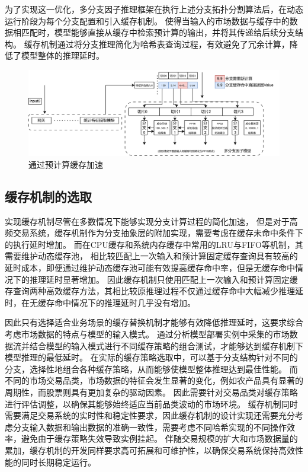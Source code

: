 为了实现这一优化，多分支因子推理框架在执行上述分支拓扑分割算法后，在动态运行阶段为每个分支配置和引入缓存机制。
使得当输入的市场数据与缓存中的数据相匹配时，模型能够直接从缓存中检索预计算的输出，并将其传递给后续分支结构。
缓存机制通过将分支推理简化为哈希表查询过程，有效避免了冗余计算，降低了模型整体的推理延时。
\begin{figure}[h]
    \centering
    \includegraphics[width=1\textwidth]{image/chap03/precom.png}
    \caption{通过预计算缓存加速}
    \label{fig:hole2}
\end{figure}

\subsection{缓存机制的选取}

实现缓存机制尽管在多数情况下能够实现分支计算过程的简化加速，
但是对于高频交易系统，缓存机制作为分支抽象层的附加实现，需要考虑在缓存未命中条件下的执行延时增加。
而在CPU缓存和系统内存缓存中常用的LRU与FIFO等机制，其需要维护动态缓存池，
相比较匹配上一次输入和预计算固定缓存查询具有较高的延时成本，即便通过维护动态缓存池可能有效提高缓存命中率，但是无缓存命中情况下的推理延时显著增加。
因此缓存机制只使用匹配上一次输入和预计算固定缓存查询两种高效缓存方法，其相比较原推理过程不仅通过缓存命中大幅减少推理延时，在无缓存命中情况下的推理延时几乎没有增加。

因此只有选择适合业务场景的缓存替换机制才能够有效降低推理延时，这要求综合考虑市场数据的特点与模型的输入模式。
通过分析模型部署实例中采集的市场数据流并结合模型的输入模式进行不同缓存策略的组合测试，才能够达到缓存机制下模型推理的最低延时。
在实际的缓存策略选取中，可以基于分支结构针对不同的分支，选择性地组合各种缓存策略，从而能够使模型整体推理达到最佳性能。
而不同的市场交易品类，市场数据的特征会发生显著的变化，例如农产品具有显著的周期性，而股票则具有更加复杂的驱动因素。
因此需要针对交易品类对缓存策略进行评估调整，以确保其能够始终适应当前品类波动的市场环境。
缓存机制同时需要满足交易系统的实时性和稳定性要求，因此缓存机制的设计实现还需要充分考虑分支输入数据和输出数据的准确一致性，需要考虑不同哈希实现的不同操作效率，避免由于缓存策略失效导致实例挂起。
伴随交易规模的扩大和市场数据量的累加，缓存机制的开发同样要求高可拓展和可维护性，以确保交易系统保持高效性能的同时长期稳定运行。
